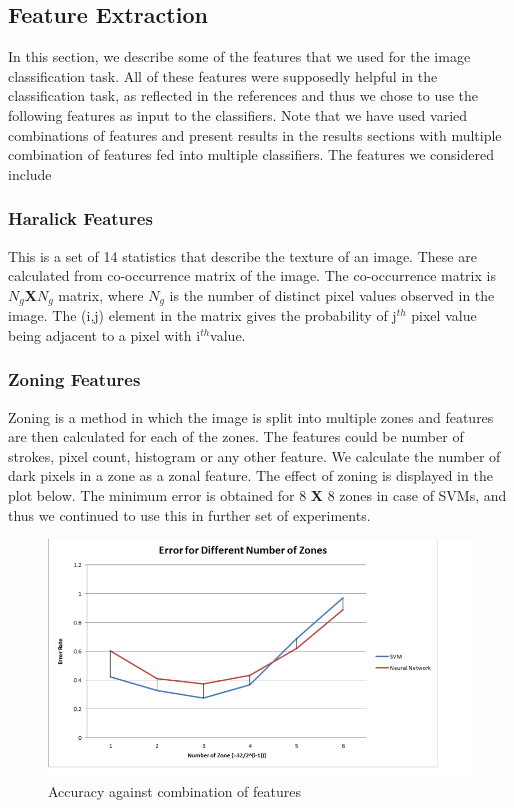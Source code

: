 \documentclass[conference]{IEEEtran}
\begin{document}
\subsection{Feature Extraction}
In this section, we describe some of the features that we used for the image classification task. All of these features were supposedly helpful in the classification task, as reflected in the references and thus we chose to use the following features as input to the classifiers. Note that we have used varied combinations of features and present results in the results sections with multiple combination of features fed into multiple classifiers. The features we considered include \\
\subsubsection{Haralick Features}
This is a set of 14 statistics that describe the texture of an image. These are calculated from co-occurrence matrix of the image. The co-occurrence matrix is $N_g${\bf X}$N_g$ matrix, where $N_g$ is the  number of distinct pixel values observed in the image. The (i,j) element in the matrix gives the probability of j$^{th}$ pixel value being adjacent to a pixel with i$^{th}$value. 

\subsubsection{Zoning Features}
Zoning is a method in which the image is split into multiple zones and features are then calculated for each of the zones. The features could be number of strokes, pixel count, histogram or any other feature. We calculate the number of dark pixels in a zone as a zonal feature. The effect of zoning is displayed in the plot below. The minimum error is obtained for 8 {\bf X} 8 zones in case of SVMs, and thus we continued to use this in further set of experiments. 
\begin{figure}[h]
  \centering
    \includegraphics[scale = 0.4]{Zones_eff.png}
  \caption{Accuracy against combination of features }
\end{figure}
\end{document}
